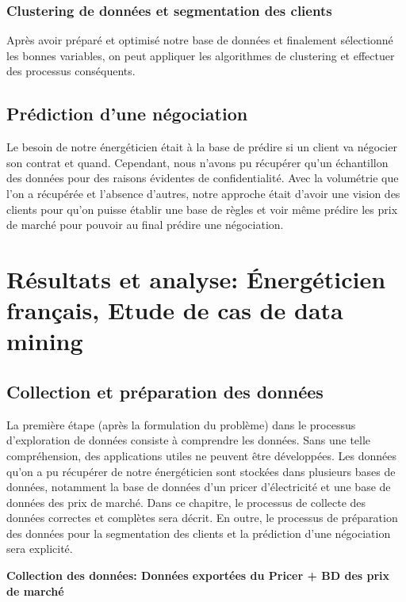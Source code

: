 \documentclass[12pt]{article}
\begin{document}
{%

\subsubsection{Clustering de données et segmentation des clients}

Après avoir préparé et optimisé notre base de données et finalement sélectionné les bonnes variables, on peut appliquer les algorithmes de clustering et effectuer des processus conséquents.


\subsection{Prédiction d’une négociation}

Le besoin de notre énergéticien était à la base de prédire si un client va négocier son contrat et quand. Cependant, nous n’avons pu récupérer qu’un échantillon des données pour des raisons évidentes de confidentialité. Avec la volumétrie que l’on a récupérée et l’absence d’autres, notre approche était d’avoir une vision des clients pour qu’on puisse établir une base de règles et voir même prédire les prix de marché pour pouvoir au final prédire une négociation.

 
\section{Résultats et analyse: Énergéticien français, Etude de cas de data mining }
\subsection{Collection et préparation des données}

La première étape (après la formulation du problème) dans le processus d'exploration de données consiste à comprendre les données. Sans une telle compréhension, des applications utiles ne peuvent être développées. 
Les données qu’on a pu récupérer de notre énergéticien sont stockées dans plusieurs bases de données, notamment la base de données d’un pricer d’électricité et une base de données des prix de marché. 
Dans ce chapitre, le processus de collecte des données correctes et complètes sera décrit. 
En outre, le processus de préparation des données pour la segmentation des clients et la prédiction d’une négociation sera explicité.


{\bf Collection des données: Données exportées du Pricer + BD des prix de marché}

}
\end{document}
